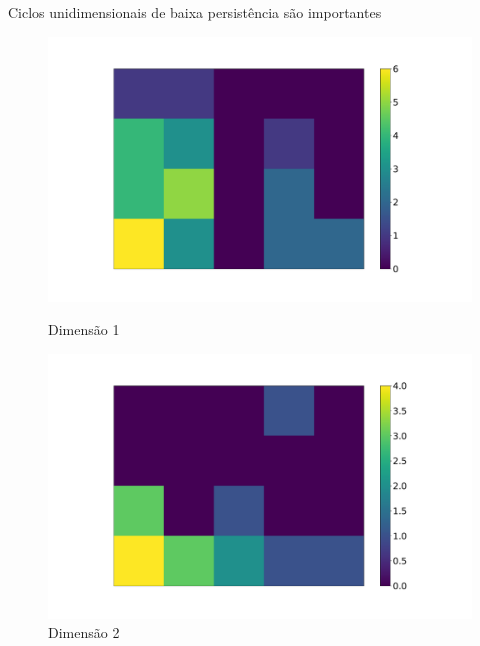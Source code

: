 \documentclass[10pt]{beamer}
\begin{document}
\begin{frame}{Ciclos unidimensionais de baixa persistência são importantes}
  \begin{figure}
    \centering
    \begin{minipage}{0.45\textwidth}
        \centering
        \includegraphics[width=1.1\textwidth]{images/heatmap_1.pdf} %
        \caption{Dimensão 1}
    \end{minipage}\hfill
    \begin{minipage}{0.45\textwidth}
        \centering
        \includegraphics[width=1.1\textwidth]{images/heatmap_2} %
        \caption{Dimensão 2}
    \end{minipage}
  \end{figure}
\end{frame}
\end{document}
